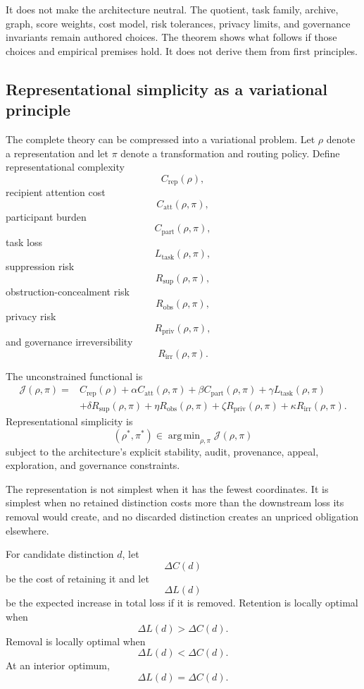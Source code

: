 \documentclass[11pt]{article}
\theoremstyle{definition}
\DeclareMathOperator{\argmin}{arg\,min}
\begin{document}
It does not make the architecture neutral. The quotient, task family, archive, graph, score weights, cost model, risk tolerances, privacy limits, and governance invariants remain authored choices. The theorem shows what follows if those choices and empirical premises hold. It does not derive them from first principles.

\subsection{Representational simplicity as a variational principle}

The complete theory can be compressed into a variational problem. Let \(\rho\) denote a representation and let \(\pi\) denote a transformation and routing policy. Define representational complexity
\[
C_{\mathrm{rep}}(\rho),
\]
recipient attention cost
\[
C_{\mathrm{att}}(\rho,\pi),
\]
participant burden
\[
C_{\mathrm{part}}(\rho,\pi),
\]
task loss
\[
L_{\mathrm{task}}(\rho,\pi),
\]
suppression risk
\[
R_{\mathrm{sup}}(\rho,\pi),
\]
obstruction-concealment risk
\[
R_{\mathrm{obs}}(\rho,\pi),
\]
privacy risk
\[
R_{\mathrm{priv}}(\rho,\pi),
\]
and governance irreversibility
\[
R_{\mathrm{irr}}(\rho,\pi).
\]

The unconstrained functional is
\[
\begin{aligned}
\mathcal{J}(\rho,\pi)
={}&
C_{\mathrm{rep}}(\rho)
+
\alpha C_{\mathrm{att}}(\rho,\pi)
+
\beta C_{\mathrm{part}}(\rho,\pi)
+
\gamma L_{\mathrm{task}}(\rho,\pi)
\\
&
+
\delta R_{\mathrm{sup}}(\rho,\pi)
+
\eta R_{\mathrm{obs}}(\rho,\pi)
+
\zeta R_{\mathrm{priv}}(\rho,\pi)
+
\kappa R_{\mathrm{irr}}(\rho,\pi).
\end{aligned}
\]
Representational simplicity is
\[
(\rho^{*},\pi^{*})
\in
\argmin_{\rho,\pi}
\mathcal{J}(\rho,\pi)
\]
subject to the architecture's explicit stability, audit, provenance, appeal, exploration, and governance constraints.

The representation is not simplest when it has the fewest coordinates. It is simplest when no retained distinction costs more than the downstream loss its removal would create, and no discarded distinction creates an unpriced obligation elsewhere.

For candidate distinction \(d\), let
\[
\Delta C(d)
\]
be the cost of retaining it and let
\[
\Delta L(d)
\]
be the expected increase in total loss if it is removed. Retention is locally optimal when
\[
\Delta L(d)>\Delta C(d).
\]
Removal is locally optimal when
\[
\Delta L(d)<\Delta C(d).
\]
At an interior optimum,
\[
\Delta L(d)=\Delta C(d).
\]
\end{document}

